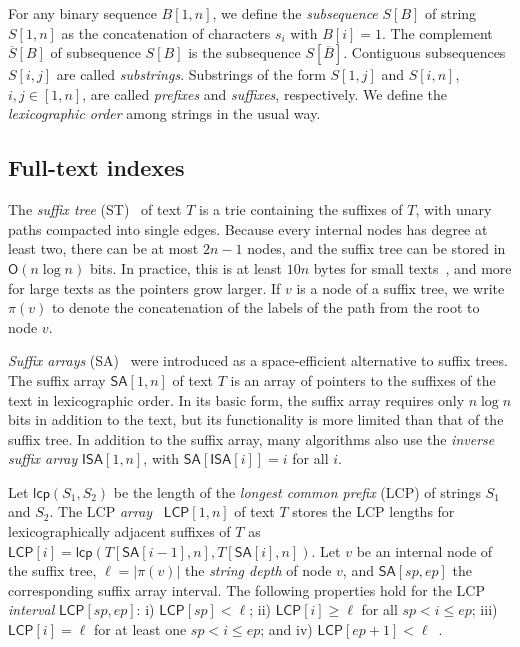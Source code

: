 \documentclass[a4paper,11pt]{llncs}
\newcommand{\abs}[1]{\ensuremath{\lvert #1 \rvert}}
\renewcommand{\complement}[1]{\ensuremath{\overline{ #1 }}}
\newcommand{\ST}{\textsf{ST}}
\newcommand{\SA}{\textsf{SA}}
\newcommand{\mSA}{\ensuremath{\mathsf{SA}}}
\newcommand{\mISA}{\ensuremath{\mathsf{ISA}}}
\newcommand{\LCP}{\textsf{LCP}}
\newcommand{\mLCP}{\ensuremath{\mathsf{LCP}}}
\newcommand{\mlcp}{\ensuremath{\mathsf{lcp}}}
\newcommand{\Oh}{\ensuremath{\mathsf{O}}}
\begin{document}
For any binary sequence $B[1,n]$, we define the \emph{subsequence} $S[B]$ of
string $S[1,n]$ as the concatenation of characters $s_{i}$ with $B[i] = 1$.
The complement $\complement{S}[B]$ of subsequence $S[B]$ is the subsequence
$S[\complement{B}]$. Contiguous subsequences $S[i,j]$ are called
\emph{substrings}. Substrings of the form $S[1,j]$ and $S[i,n]$, $i,j \in
[1,n]$, are called \emph{prefixes} and \emph{suffixes}, respectively. We
define the \emph{lexicographic order} among strings in the usual way.

\subsection{Full-text indexes}

The \emph{suffix tree} (\ST)~\cite{Weiner1973} of text $T$ is a trie
containing the suffixes of $T$, with unary paths compacted into single edges.
Because every internal nodes has degree at least two, there can be at most
$2n-1$ nodes, and the suffix tree can be stored in $\Oh(n \log n)$ bits. In
practice, this is at least $10n$ bytes for small texts~\cite{Kurtz1999}, and
more for large texts as the pointers grow larger. If $v$ is a node of a suffix
tree, we write $\pi(v)$ to denote the concatenation of the labels of the path
from the root to node $v$.

\emph{Suffix arrays} (\SA)~\cite{Manber1993} were introduced as a
space-efficient alternative to suffix trees. The suffix array $\mSA[1,n]$ of
text $T$ is an array of pointers to the suffixes of the text in lexicographic
order. In its basic form, the suffix array requires only $n \log n$ bits in
addition to the text, but its functionality is more limited than that of the
suffix tree. In addition to the suffix array, many algorithms also use the
\emph{inverse suffix array} $\mISA[1,n]$, with $\mSA[\mISA[i]] = i$ for all
$i$.

Let $\mlcp(S_{1}, S_{2})$ be the length of the \emph{longest common prefix}
(\LCP) of strings $S_{1}$ and $S_{2}$. The \LCP{}
\emph{array}~\cite{Manber1993} $\mLCP[1,n]$ of text $T$ stores the \LCP{}
lengths for lexicographically adjacent suffixes of $T$ as $\mLCP[i] =
\mlcp(T[\mSA[i-1],n], T[\mSA[i],n])$. Let $v$ be an internal node of the
suffix tree, $\ell = \abs{\pi(v)}$ the \emph{string depth} of node $v$, and
$\mSA[sp,ep]$ the corresponding suffix array interval. The following
properties hold for the \LCP{} \emph{interval} $\mLCP[sp,ep]$: i) $\mLCP[sp] <
\ell$; ii) $\mLCP[i] \ge \ell$ for all $sp < i \le ep$; iii) $\mLCP[i] = \ell$
for at least one $sp < i \le ep$; and iv) $\mLCP[ep+1] <
\ell$~\cite{Abouelhoda2004}.
\end{document}
